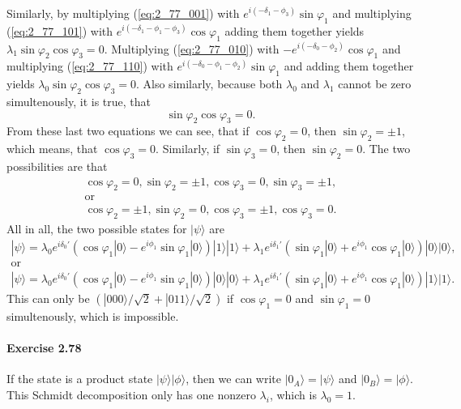 \documentclass[a4paper,12pt]{article}
\newcommand{\exercise}[1]{\paragraph{Exercise #1}}
\newcommand{\ra}{\rangle}
\begin{document}
    Similarly, by multiplying (\ref{eq:2_77_001}) with $e^{i(-\delta_1-\phi_3)} \sin \varphi_1$ and multiplying (\ref{eq:2_77_101}) with $e^{i(-\delta_1-\phi_1-\phi_3)} \cos \varphi_1$ adding them together yields $\lambda_1 \sin \varphi_2 \cos \varphi_3 = 0$. Multiplying (\ref{eq:2_77_010}) with $-e^{i(-\delta_0-\phi_2)} \cos \varphi_1$ and multiplying (\ref{eq:2_77_110}) with $e^{i(-\delta_0-\phi_1-\phi_2)} \sin \varphi_1$ and adding them together yields $\lambda_0 \sin \varphi_2 \cos \varphi_3 = 0$. Also similarly, because both $\lambda_0$ and $\lambda_1$ cannot be zero simultenously, it is true, that
    \begin{equation}
        \sin \varphi_2 \cos \varphi_3 = 0 \textrm{.}
    \end{equation}
    From these last two equations we can see, that if $\cos \varphi_2 = 0$, then $\sin \varphi_2 = \pm 1$, which means, that $\cos \varphi_3 = 0$. Similarly, if $\sin \varphi_3 = 0$, then $\sin \varphi_2 = 0$. The two possibilities are that
    \begin{gather}
        \nonumber
        \cos \varphi_2 = 0, \sin \varphi_2 = \pm 1, \cos \varphi_3 = 0, \sin \varphi_3 = \pm 1 \textrm{,}\\
        \nonumber
        \textrm{or}\\
        \cos \varphi_2 = \pm 1, \sin \varphi_2 = 0, \cos \varphi_3 = \pm 1, \cos \varphi_3 = 0 \textrm{.}
    \end{gather}
    All in all, the two possible states for $| \psi \ra$ are
    \begin{gather}
        \nonumber
        | \psi \ra =
        \lambda_0 e^{i \delta_0'} (\cos \varphi_1 | 0 \ra - e^{i \phi_1} \sin \varphi_1 | 0 \ra) |1 \ra | 1 \ra +
        \lambda_1 e^{i \delta_1'} (\sin \varphi_1 | 0 \ra + e^{i \phi_1} \cos \varphi_1 | 0 \ra) |0 \ra | 0 \ra \textrm{,} \\
        \nonumber
        \textrm{or} \\
        | \psi \ra =
        \lambda_0 e^{i \delta_0'} (\cos \varphi_1 | 0 \ra - e^{i \phi_1} \sin \varphi_1 | 0 \ra) |0 \ra | 0 \ra +
        \lambda_1 e^{i \delta_1'} (\sin \varphi_1 | 0 \ra + e^{i \phi_1} \cos \varphi_1 | 0 \ra) |1 \ra | 1 \ra \textrm{.}
    \end{gather}
    This can only be $(|000\ra / \sqrt{2} + |011\ra / \sqrt{2})$ if $\cos \varphi_1 = 0$ and $\sin \varphi_1 = 0$ simultenously, which is impossible.

    \exercise{2.78} If the state is a product state $| \psi \ra | \phi \ra$, then we can write $|0_A \ra = | \psi \ra$ and $|0_B \ra = | \phi \ra$. This Schmidt decomposition only has one nonzero $\lambda_i$, which is $\lambda_0 = 1$.
\end{document}
